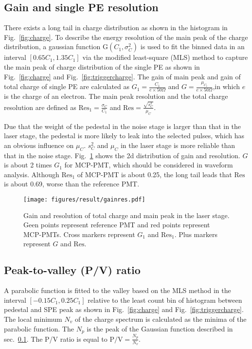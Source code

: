 \subsection{Gain and single PE resolution}
\label{sec:noisegain}

There exists a long tail in charge distribution as shown in the histogram in Fig.~\ref{fig:charge}. To describe the energy resolution of the main peak of the charge distribution, a gaussian function G$(C_1,\sigma^2_{C})$ is used to fit the binned data in an interval $[0.65C_1, 1.35C_1]$ via the modified least-square (MLS) method \cite{Cowan1998StatisticalDA} to capture the main peak of charge distribution of the single PE as shown in Fig.~\ref{fig:charge} and Fig.~\ref{fig:triggercharge}. The gain of main peak and gain of total charge of single PE are calculated as $G_1=\frac{C_1}{e\times 50\Omega}$ and $G= \frac{\mu_{C_t}}{e\times 50\Omega}$,in which $e$ is the charge of an electron. The main peak resolution and the total charge resolution are defined as $\mathrm{Res}_1=\frac{\sigma_{C}}{C_1}$ and $\mathrm{Res}=\frac{\sqrt{s^2_{C}}}{\mu_{C}}$.

Due that the weight of the pedestal in the noise stage is larger than that in the laser stage, the pedestal is more likely to leak into the selected pulses, which has an obvious influence on $\mu_{C}$. $s^2_{C}$ and $\mu_{C}$ in the laser stage is more reliable than that in the noise stage. Fig.~\ref{fig:totalchargeCompare} shows the 2d distribution of gain and resolution.
$G$ is about 2 times $G_1$ for MCP-PMT, which should be considered in waveform analysis. Although $\mathrm{Res}_1$ of MCP-PMT is about 0.25, the long tail leads that $\mathrm{Res}$ is about 0.69, worse than the reference PMT.

\begin{figure}[!htbp]
    \centering
    \texttt{[image: figures/result/gainres.pdf]}
    \caption{Gain and resolution of total charge and main peak in the laser stage. Geen points represent reference PMT and red points represent MCP-PMTs. Cross markers represent $G_1$ and $\mathrm{Res}_1$. Plus markers represent $G$ and $\mathrm{Res}$.}
    \label{fig:totalchargeCompare}
\end{figure}

\subsection{Peak-to-valley (P/V) ratio}
A parabolic function is fitted to the valley based on the MLS method in the interval $[-0.15C_1, 0.25C_1]$ relative to the least count bin of histogram between pedestal and SPE peak as shown in Fig.~\ref{fig:charge} and Fig.~\ref{fig:triggercharge}. The local minimum $N_v$ of the charge spectrum is calculated as the minima of the parabolic function. The $N_p$ is the peak of the Gaussian function described in sec.~\ref{sec:noisegain}. The P/V ratio is equal to $\mathrm{P/V}=\frac{N_p}{N_v}$.

